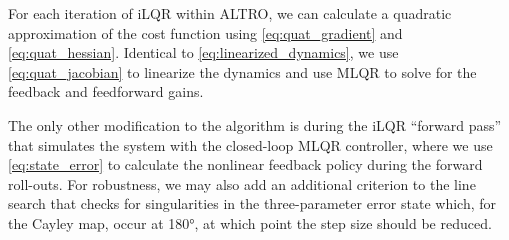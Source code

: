 \documentclass{svproc}
\newcommand{\traj}[2][N]{#2_{0:{#1}}}
\begin{document}
        For each iteration of iLQR within ALTRO, we can calculate a quadratic approximation of the cost function using \eqref{eq:quat_gradient} and \eqref{eq:quat_hessian}. 
        Identical to \eqref{eq:linearized_dynamics}, we use \eqref{eq:quat_jacobian} to linearize the dynamics and use MLQR to solve for the feedback and feedforward gains. 
        
        The only other modification to the algorithm is during the iLQR ``forward pass'' that simulates the system with the closed-loop MLQR controller, where we use \eqref{eq:state_error} to calculate the nonlinear feedback policy during the forward roll-outs.
        For robustness, we may also add an additional criterion to the line search that checks for singularities in the three-parameter error state which, for the Cayley map, occur at \ang{180}, at which point the step size should be reduced.
        
    
        
\end{document}
